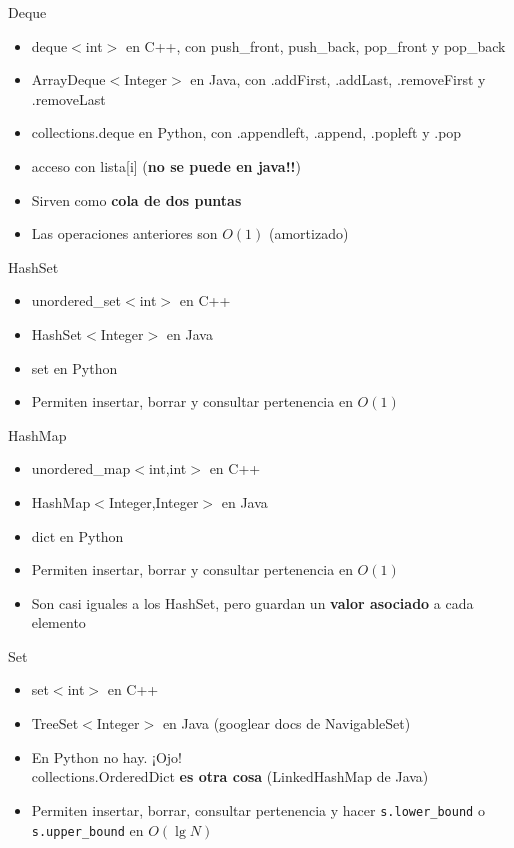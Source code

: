 \documentclass{beamer}
\begin{document}
\begin{frame}{Deque}
    \begin{itemize}
        \item deque$<$int$>$ en C++, con push\_front, push\_back, pop\_front y pop\_back
        \item ArrayDeque$<$Integer$>$ en Java, con .addFirst, .addLast, .removeFirst y .removeLast
        \item collections.deque en Python, con .appendleft, .append, .popleft y .pop
        \item acceso con lista[i] (\textbf{no se puede en java!!})
        \item Sirven como \textbf{cola de dos puntas}
        \item Las operaciones anteriores son $O(1)$ (amortizado)
    \end{itemize}
\end{frame}

\begin{frame}{HashSet}
    \begin{itemize}
        \item unordered\_set$<$int$>$ en C++
        \item HashSet$<$Integer$>$ en Java
        \item set en Python
        \item Permiten insertar, borrar y consultar pertenencia en $O(1)$
    \end{itemize}
\end{frame}

\begin{frame}{HashMap}
    \begin{itemize}
        \item unordered\_map$<$int,int$>$ en C++
        \item HashMap$<$Integer,Integer$>$ en Java
        \item dict en Python
        \item Permiten insertar, borrar y consultar pertenencia en $O(1)$
        \item Son casi iguales a los HashSet, pero guardan un \textbf{valor asociado} a cada elemento
    \end{itemize}
\end{frame}

\begin{frame}{Set}
    \begin{itemize}
        \item set$<$int$>$ en C++
        \item TreeSet$<$Integer$>$ en Java (googlear docs de NavigableSet)
        \item En Python no hay. ¡Ojo! \\ collections.OrderedDict \textbf{es otra cosa} (LinkedHashMap de Java)
        \item Permiten insertar, borrar, consultar pertenencia y hacer \texttt{s.lower\_bound} o \texttt{s.upper\_bound} en $O(\lg N)$
    \end{itemize}
\end{frame}
\end{document}
